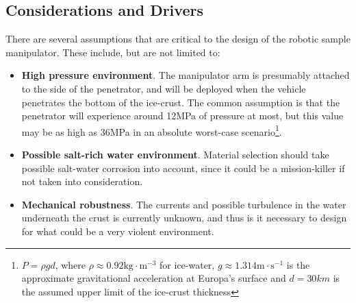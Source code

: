 \subsection{Considerations and Drivers}
There are several assumptions that are critical to the design of the robotic sample manipulator. These include, but are not limited to:
\\ 
\begin{itemize}
\item \textbf{High pressure environment}. The manipulator arm is presumably attached to the side of the penetrator, and will be deployed when the vehicle penetrates the bottom of the ice-crust. The common assumption is that the penetrator will experience around 12MPa of pressure at most, but this value may be as high as 36MPa in an absolute worst-case scenario\footnote{$P=\rho g d$, where $\rho\approx 0.92 \mathrm{kg\cdot m^{-3}}$ for ice-water, $g\approx 1.314\mathrm{m\cdot s^{-1}}$ is the approximate gravitational acceleration at Europa's surface and $d=30km$ is the assumed upper limit of the ice-crust thickness}.
\item \textbf{Possible salt-rich water environment}. Material selection should take possible salt-water corrosion into account, since it could be a mission-killer if not taken into consideration. 
\item \textbf{Mechanical robustness}. The currents and possible turbulence in the water underneath the crust is currently unknown, and thus is it necessary to design for what could be a very violent environment. 
\end{itemize}

